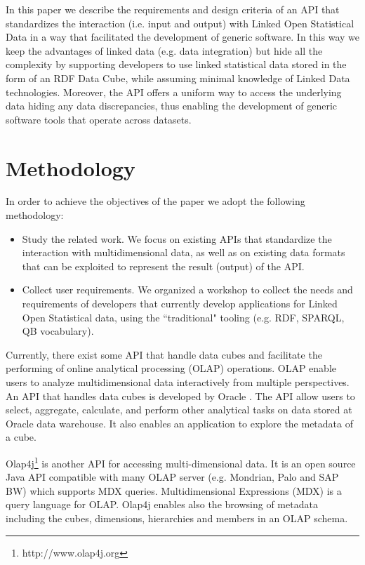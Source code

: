 \documentclass{llncs}
\begin{document}
In this paper we describe the requirements and design criteria of an API that standardizes the interaction (i.e. input and output) with Linked Open Statistical Data in a way that facilitated the development of generic software. In this way we keep the advantages of linked data (e.g. data integration) but hide all the complexity by supporting developers to use linked statistical data stored in the form of an RDF Data Cube, while assuming minimal knowledge of Linked Data technologies. Moreover, the API offers a uniform way to access the underlying data hiding any data discrepancies, thus enabling the development of generic software tools that operate across datasets. 

\section{Methodology}\label{sec:methodology}

In order to achieve the objectives of the paper we adopt the following methodology:
\begin{itemize}
\item Study the related work. We focus on existing APIs that standardize the interaction with multidimensional data, as well as on existing data formats that can be exploited to represent the result (output) of the API. 
\item Collect user requirements. We organized a workshop to collect the needs and requirements of developers that currently develop applications for Linked Open Statistical data, using the ``traditional" tooling (e.g. RDF, SPARQL, QB vocabulary). 
\end{itemize}

Currently, there exist some API that handle data cubes and facilitate the performing of online analytical processing (OLAP) operations. OLAP enable users to analyze multidimensional data interactively from multiple perspectives. An API that handles data cubes is developed by Oracle \cite{ORACLEAPI}. The API allow users to select, aggregate, calculate, and perform other analytical tasks on data stored at Oracle data warehouse. It also enables an application to explore the metadata of a cube.

Olap4j\footnote{http://www.olap4j.org} is another API for accessing multi-dimensional data. It is an  open source Java API compatible with many OLAP server (e.g. Mondrian, Palo and SAP BW) which supports MDX queries. Multidimensional Expressions (MDX) is a query language for OLAP. Olap4j enables also the browsing of metadata including the cubes, dimensions, hierarchies and members in an OLAP schema.
\end{document}
